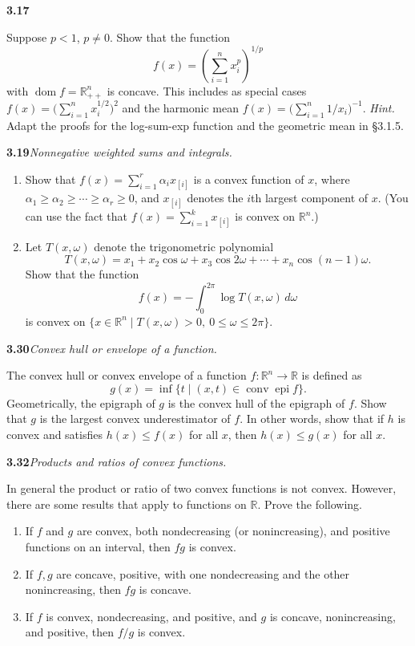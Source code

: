 \documentclass[11pt,a4paper]{article}
\newcommand{\R}{\mathbb{R}}
\newcommand{\dom}{\operatorname{dom}}
\newcommand{\epi}{\operatorname{epi}}
\newcommand{\conv}{\operatorname{conv}}
\newcommand{\ex}[2]{%
  \Needspace{5\baselineskip}%
  \par\medskip\noindent\textbf{#1}\quad\textit{#2}\quad\ignorespaces
}
\begin{document}
\ex{3.17}{}
Suppose $p<1$, $p\neq0$. Show that the function
\[
  f(x)=\left(\sum_{i=1}^{n}x_i^p\right)^{1/p}
\]
with $\dom f=\R_{++}^{n}$ is concave. This includes as special cases
$f(x)=\bigl(\sum_{i=1}^{n}x_i^{1/2}\bigr)^2$ and the harmonic mean
$f(x)=\bigl(\sum_{i=1}^{n}1/x_i\bigr)^{-1}$.
\textit{Hint.} Adapt the proofs for the log-sum-exp function and the geometric mean in
\S3.1.5.

\ex{3.19}{Nonnegative weighted sums and integrals.}
\begin{enumerate}
\item Show that $f(x)=\sum_{i=1}^{r}\alpha_i x_{[i]}$ is a convex function of $x$,
where $\alpha_1\geq\alpha_2\geq\cdots\geq\alpha_r\geq0$, and $x_{[i]}$ denotes
the $i$th largest component of $x$. (You can use the fact that
$f(x)=\sum_{i=1}^{k}x_{[i]}$ is convex on $\R^n$.)
\item Let $T(x,\omega)$ denote the trigonometric polynomial
\[
 T(x,\omega)=x_1+x_2\cos\omega+x_3\cos2\omega+\cdots+x_n\cos(n-1)\omega.
\]
Show that the function
\[
 f(x)=-\int_0^{2\pi}\log T(x,\omega)\,d\omega
\]
is convex on $\{x\in\R^n\mid T(x,\omega)>0,\ 0\leq\omega\leq2\pi\}$.
\end{enumerate}

\ex{3.30}{Convex hull or envelope of a function.}
The convex hull or convex envelope of a function $f:\R^n\to\R$ is defined as
\[
  g(x)=\inf\{t\mid(x,t)\in\conv\epi f\}.
\]
Geometrically, the epigraph of $g$ is the convex hull of the epigraph of $f$.
Show that $g$ is the largest convex underestimator of $f$. In other words, show
that if $h$ is convex and satisfies $h(x)\leq f(x)$ for all $x$, then
$h(x)\leq g(x)$ for all $x$.

\ex{3.32}{Products and ratios of convex functions.}
In general the product or ratio of two convex functions is not convex.
However, there are some results that apply to functions on $\R$. Prove the following.
\begin{enumerate}
\item If $f$ and $g$ are convex, both nondecreasing (or nonincreasing), and positive
functions on an interval, then $fg$ is convex.
\item If $f,g$ are concave, positive, with one nondecreasing and the other
nonincreasing, then $fg$ is concave.
\item If $f$ is convex, nondecreasing, and positive, and $g$ is concave,
nonincreasing, and positive, then $f/g$ is convex.
\end{enumerate}
\end{document}
